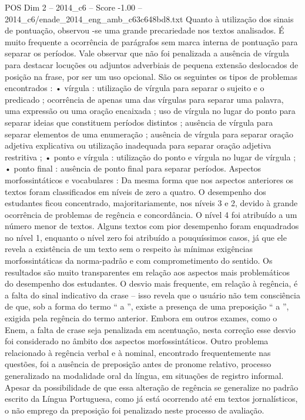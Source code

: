 \begin{textsample}{POS Dim 2 – 2014\_c6 – Score -1.00 – 2014\_c6/enade\_2014\_eng\_amb\_c63c648bd8.txt}
Quanto à utilização dos sinais de pontuação, observou -se uma grande precariedade nos textos analisados.
É muito frequente a ocorrência de parágrafos sem marca interna de pontuação para separar os períodos.
Vale observar que não foi penalizada a ausência de vírgula para destacar locuções ou adjuntos adverbiais de pequena extensão deslocados de posição na frase, por ser um uso opcional.
São os seguintes os tipos de problemas encontrados : • vírgula : utilização de vírgula para separar o sujeito e o predicado ; ocorrência de apenas uma das vírgulas para separar uma palavra, uma expressão ou uma oração encaixada ; uso de vírgula no lugar do ponto para separar ideias que constituem períodos distintos ; ausência de vírgula para separar elementos de uma enumeração ; ausência de vírgula para separar oração adjetiva explicativa ou utilização inadequada para separar oração adjetiva restritiva ; • ponto e vírgula : utilização do ponto e vírgula no lugar de vírgula ; • ponto final : ausência de ponto final para separar períodos.
Aspectos morfossintáticos e vocabulares : Da mesma forma que nos aspectos anteriores os textos foram classificados em níveis de zero a quatro.
O desempenho dos estudantes ficou concentrado, majoritariamente, nos níveis 3 e 2, devido à grande ocorrência de problemas de regência e concordância.
O nível 4 foi atribuído a um número menor de textos.
Alguns textos com pior desempenho foram enquadrados no nível 1, enquanto o nível zero foi atribuído a pouquíssimos casos, já que ele revela a existência de um texto sem o respeito às mínimas exigências morfossintáticas da norma-padrão e com comprometimento do sentido.
Os resultados são muito transparentes em relação aos aspectos mais problemáticos do desempenho dos estudantes.
O desvio mais frequente, em relação à regência, é a falta do sinal indicativo da crase – isso revela que o usuário não tem consciência de que, sob a forma do termo “ a ”, existe a presença de uma preposição “ a ”, exigida pela regência do termo anterior.
Embora em outros exames, como o Enem, a falta de crase seja penalizada em acentuação, nesta correção esse desvio foi considerado no âmbito dos aspectos morfossintáticos.
Outro problema relacionado à regência verbal e à nominal, encontrado frequentemente nas questões, foi a ausência de preposição antes de pronome relativo, processo generalizado na modalidade oral da língua, em situações de registro informal.
Apesar da possibilidade de que essa alteração de regência se generalize no padrão escrito da Língua Portuguesa, como já está ocorrendo até em textos jornalísticos, o não emprego da preposição foi penalizado neste processo de avaliação.

\end{textsample}
